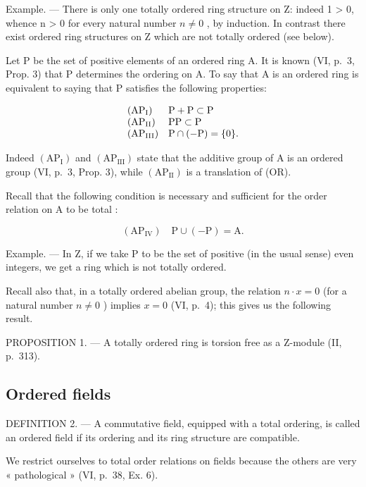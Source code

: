 Example. --- There is only one totally ordered ring structure on Z: indeed 1 \textgreater{} 0, whence n \textgreater{} 0 for every natural number \(n \neq 0\) , by induction. In contrast there exist ordered ring structures on Z which are not totally ordered (see below).

Let P be the set of positive elements of an ordered ring A. It is known (VI, p.~3, Prop. 3) that P determines the ordering on A. To say that A is an ordered ring is equivalent to saying that P satisfies the following properties:

\[
\begin{array}{l l} \left(\mathrm{AP} _ {\mathrm{I}}\right) & \mathrm{P} + \mathrm{P} \subset \mathrm{P} \\ \left(\mathrm{AP} _ {\mathrm{II}}\right) & \mathrm{PP} \subset \mathrm{P} \\ \left(\mathrm{AP} _ {\mathrm{III}}\right) & \mathrm{P} \cap (- \mathrm{P}) = \{0 \}. \end{array}
\]

Indeed \((\mathrm{AP}_{\mathrm{I}})\) and \((\mathrm{AP}_{\mathrm{III}})\) state that the additive group of A is an ordered group (VI, p.~3, Prop. 3), while \((\mathrm{AP}_{\mathrm{II}})\) is a translation of (OR).

Recall that the following condition is necessary and sufficient for the order relation on A to be total :

\[
\left(\mathrm{AP} _ {\mathrm{IV}}\right) \quad \mathrm{P} \cup (- \mathrm{P}) = \mathrm{A}.
\]

Example. --- In Z, if we take P to be the set of positive (in the usual sense) even integers, we get a ring which is not totally ordered.

Recall also that, in a totally ordered abelian group, the relation \(n \cdot x = 0\) (for a natural number \(n \neq 0\) ) implies \(x = 0\) (VI, p.~4); this gives us the following result.

PROPOSITION 1. --- A totally ordered ring is torsion free as a Z-module (II, p.~313).

\subsection{Ordered fields}

DEFINITION 2. --- A commutative field, equipped with a total ordering, is called an ordered field if its ordering and its ring structure are compatible.

We restrict ourselves to total order relations on fields because the others are very « pathological » (VI, p.~38, Ex. 6).

